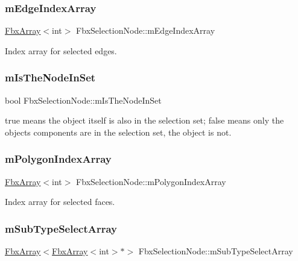 \subsubsection{\texorpdfstring{m\+Edge\+Index\+Array}{mEdgeIndexArray}}
{\footnotesize\ttfamily \hyperlink{class_fbx_array}{Fbx\+Array}$<$int$>$ Fbx\+Selection\+Node\+::m\+Edge\+Index\+Array}

Index array for selected edges. \mbox{\label{class_fbx_selection_node_abe086e3632a8526188a5c706f3edff0d}} 
\subsubsection{\texorpdfstring{m\+Is\+The\+Node\+In\+Set}{mIsTheNodeInSet}}
{\footnotesize\ttfamily bool Fbx\+Selection\+Node\+::m\+Is\+The\+Node\+In\+Set}

{\ttfamily true} means the object itself is also in the selection set; {\ttfamily false} means only the object\textquotesingle{}s components are in the selection set, the object is not. \mbox{\label{class_fbx_selection_node_a542b95a44b33e6b88af56e202612583f}} 
\subsubsection{\texorpdfstring{m\+Polygon\+Index\+Array}{mPolygonIndexArray}}
{\footnotesize\ttfamily \hyperlink{class_fbx_array}{Fbx\+Array}$<$int$>$ Fbx\+Selection\+Node\+::m\+Polygon\+Index\+Array}

Index array for selected faces. \mbox{\label{class_fbx_selection_node_abb893b8d98420522d6bc2790780b54a3}} 
\subsubsection{\texorpdfstring{m\+Sub\+Type\+Select\+Array}{mSubTypeSelectArray}}
{\footnotesize\ttfamily \hyperlink{class_fbx_array}{Fbx\+Array}$<$\hyperlink{class_fbx_array}{Fbx\+Array}$<$int$>$$\ast$$>$ Fbx\+Selection\+Node\+::m\+Sub\+Type\+Select\+Array}

